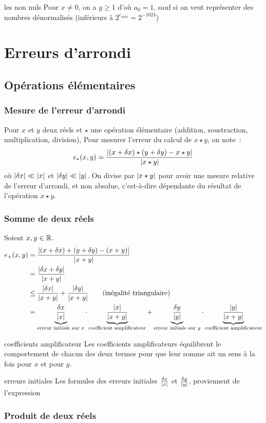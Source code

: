 \begin{remarque}{}{les non nuls}
    Pour $x\neq 0$, on a $y\geq 1$ d'où $a_0 = 1$, sauf si on veut représenter des nombres dénormalisés (inférieurs à  $2^{e_{min}}=2^{-1024}$)
\end{remarque}


\newcommand{\dx}{\delta x}
\newcommand{\dy}{\delta y}
\newcommand{\fracabs}[2]{\frac{\abs{#1}}{\abs{#2}}}
\section{Erreurs d'arrondi}
\subsection{Opérations élémentaires}
\subsubsection{Mesure de l'erreur d'arrondi}
Pour $x$ et $y$ deux réels et $\star$ une opération élémentaire (addition, soustraction, multiplication, division), Pour mesurer l'erreur du calcul de $x \star y$, on note~:
$$e_\star(x,y) = \fracabs{(x + \dx)\star(y+\dy) - x \star y}{x\star y}$$
où $|\delta x| \ll |x|$ et $|\delta y| \ll |y|$.
On divise par $|x \star y|$ pour avoir une mesure relative de l'erreur d'arrondi, et non absolue, c'est-à-dire dépendante du résultat de l'opération $x \star y$.
\subsubsection{Somme de deux réels}
Soient $x,y \in \mathbb{R}$. 
\begin{align*}
e_+(x,y) &= \frac{|(x+\delta x) + (y + \delta y) - (x+y)|}{|x+y|}\\
  &= \frac{|\delta x + \delta y|}{|x+y|}\\
  &\le \frac{|\delta x|}{|x+y|} + \frac{|\delta y|}{|x+y|}
     \qquad\text{(inégalité triangulaire)}\\
  &= \underbrace{\frac{\delta x}{|x|}}_{\text{erreur initiale sur $x$}}
     \cdot \underbrace{\frac{|x|}{|x+y|}}_{\text{coefficient amplificateur}}
   + \underbrace{\frac{\delta y}{|y|}}_{\text{erreur initiale sur $y$}}
     \cdot \underbrace{\frac{|y|}{|x+y|}}_{\text{coefficient amplificateur}}
\end{align*}

\begin{remarque}{}{coefficients amplificateur}
    Les coefficients amplificateurs équilibrent le comportement de chacun des deux termes pour que leur somme ait un sens à la fois pour $x$ et pour $y$.
\end{remarque}

\begin{remarque}{}{erreurs initiales}
    Les formules des erreurs initiales $\frac{\delta x}{|x|}$ et $\frac{\delta y}{|y|}$, proviennent de l'expression
    $$ $$
    
\end{remarque}

\subsubsection{Produit de deux réels}


